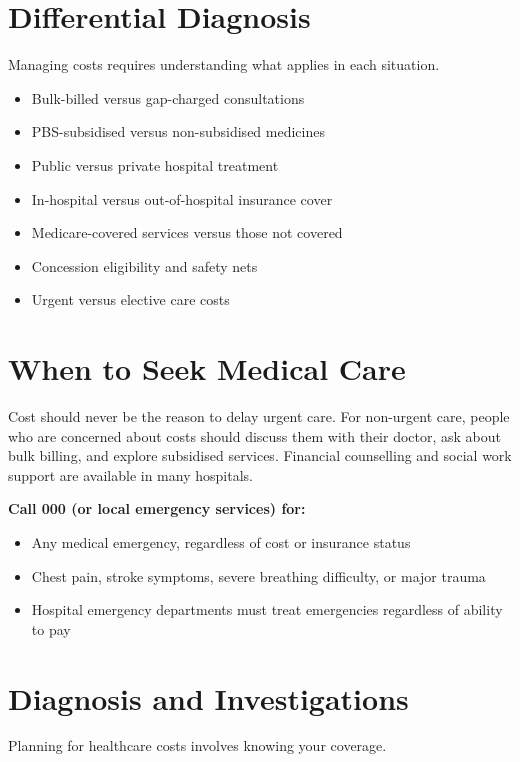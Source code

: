 \section*{Differential Diagnosis}
Managing costs requires understanding what applies in each situation.

\begin{itemize}
    \item Bulk-billed versus gap-charged consultations
    \item PBS-subsidised versus non-subsidised medicines
    \item Public versus private hospital treatment
    \item In-hospital versus out-of-hospital insurance cover
    \item Medicare-covered services versus those not covered
    \item Concession eligibility and safety nets
    \item Urgent versus elective care costs
\end{itemize}

\section*{When to Seek Medical Care}
Cost should never be the reason to delay urgent care. For non-urgent care, people who are concerned about costs should discuss them with their doctor, ask about bulk billing, and explore subsidised services. Financial counselling and social work support are available in many hospitals.

\textbf{Call 000 (or local emergency services) for:}
\begin{itemize}
    \item Any medical emergency, regardless of cost or insurance status
    \item Chest pain, stroke symptoms, severe breathing difficulty, or major trauma
    \item Hospital emergency departments must treat emergencies regardless of ability to pay
\end{itemize}

\section*{Diagnosis and Investigations}
Planning for healthcare costs involves knowing your coverage.

